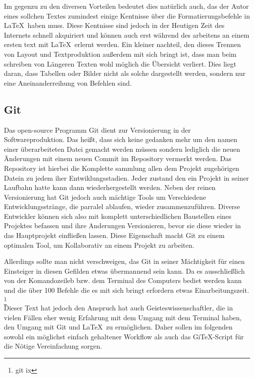 \documentclass[12pt,a4paper]{scrartcl}
\begin{document}
Im gegenzu zu den diversen Vorteilen bedeutet dies natürlich auch, das der Autor eines sollchen Textes zumindest einige Kentnisse über die Formatierungsbefehle in \LaTeX \ haben muss. Diese Kentnisse sind jedoch in der Heutigen Zeit des Internets schnell akquiriert und können auch erst während des arbeitens an einem ersten text mit \LaTeX \ erlernt werden. Ein kleiner nachteil, den dieses Trennen von Layout und Textproduktion außerdem mit sich bringt ist, dass man beim schreiben von Längeren Texten wohl möglich die Übersicht verliert. Dies liegt daran, dass Tabellen oder Bilder nicht als solche dargestellt werden, sondern nur eine Aneinanderreihung von Befehlen sind.

\subsection{Git}

Das open-source Programm Git dient zur Versionierung in der Softwareproduktion. Das heißt, dass sich keine gedanken mehr um den namen einer überarbeiteten Datei gemacht werden müssen sondern lediglich die neuen Änderungen mit einem neuen Commit im Repository vermerkt werden. Das Repository ist hierbei die Komplette sammlung allen dem Projekt zugehörigen Datein zu jedem iher Entwiklungsstadien. Jeder zustand den ein Projekt in seiner Laufbahn hatte kann dann wiederhergestellt werden. Neben der reinen Versionierung hat Git jedoch auch mächtige Tools um Verschiedene Entwicklungsstränge, die parralel ablaufen, wieder zusammenzuführen. Diverse Entwickler können sich also mit komplett unterschiedlichen Baustellen eines Projektes befassen und ihre Anderungen Versionieren, bevor sie diese wieder in das Hauptprojekt einfließen lassen. Diese Eigenschaft macht Git zu einem optimalen Tool, um Kollaborativ an einem Projekt zu arbeiten. 

Allerdings sollte man nicht verschweigen, das Git in seiner Mächtigkeit für einen Einsteiger in diesen Gefilden etwas übermannend sein kann. Da es ausschließlich von der Komandozeileb bzw. dem Terminal des Computers bediet werden kann und die über 100 Befehle die es mit sich bringt erfordern etwas Einarbeitungszeit. \footnote{git ix} 
\bigskip \\
Dieser Text hat jedoch den Anspruch hat auch Geisteswissenschaftler, die in vielen Fällen eher wenig Erfahrung mit dem Umgang mit dem Terminal haben, den Umgang mit Git und \LaTeX \ zu ermöglichen. Daher sollen im folgenden sowohl ein möglichst einfach gehaltener Workflow als auch das GiTeX-Script für die Nötige Vereinfachung sorgen.
\end{document}
